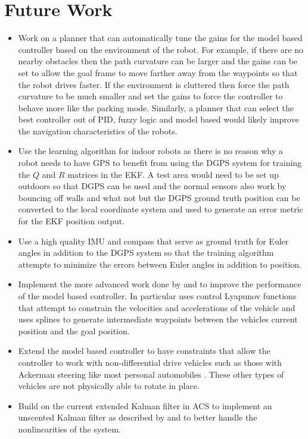\chapter{Future Work}
\label{ch:futurework}

\begin{itemize}
\item Work on a planner that can automatically tune the gains for the model based controller based on the environment of the robot. For example, if there are no nearby obstacles then the path curvature can be larger and the gains can be set to allow the goal frame to move farther away from the waypoints so that the robot drives faster. If the environment is cluttered then force the path curvature to be much smaller and set the gains to force the controller to behave more like the parking mode. Similarly, a planner that can select the best controller out of PID, fuzzy logic and model based would likely improve the navigation characteristics of the robots.
\item Use the learning algorithm for indoor robots as there is no reason why a robot needs to have GPS to benefit from using the DGPS system for training the $Q$ and $R$ matrices in the EKF. A test area would need to be set up outdoors so that DGPS can be used and the normal sensors also work by bouncing off walls and what not but the DGPS ground truth position can be converted to the local coordinate system and used to generate an error metric for the EKF position output.
\item Use a high quality IMU and compass that serve as ground truth for Euler angles in addition to the DGPS system so that the training algorithm attempts to minimize the errors between Euler angles in addition to position.
\item Implement the more advanced work done by \cite{Lapierre06} and \cite{Gulati08} to improve the performance of the model based controller. In particular \cite{Gulati08} uses control Lyapunov functions that attempt to constrain the velocities and accelerations of the vehicle and uses splines to generate intermediate waypoints between the vehicles current position and the goal position.
\item Extend the model based controller to have constraints that allow the controller to work with non-differential drive vehicles such as those with Ackerman steering like most personal automobiles \cite{Shiller91dynamicmotion}. These other types of vehicles are not physically able to rotate in place.
\item Build on the current extended Kalman filter in ACS to implement an unscented Kalman filter as described by \cite{ThrunProbRobots06} and \cite{Orderud05} to better handle the nonlinearities of the system.
\end{itemize}
